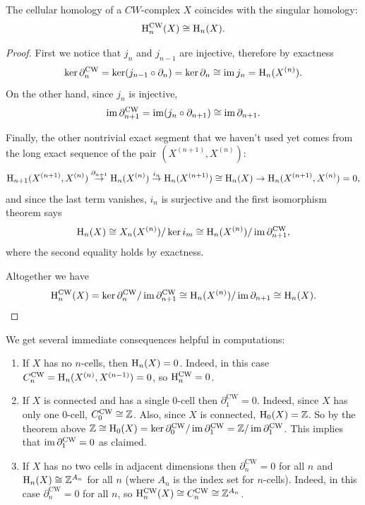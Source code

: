 \begin{thm}
    The cellular homology of a $CW$-complex $X$ coincides with the singular homology:
    \[\mathrm{H}_n^{\mathrm{CW}}(X)\cong \mathrm{H}_n(X).\]
\end{thm}
\begin{proof}
    First we notice that $j_{n}$ and $j_{n-1}$ are injective, therefore by exactness
    \[\ker\partial_n^{\mathrm{CW}}=\ker (j_{n-1}\circ\partial_n)=\ker\partial_{n}\cong \operatorname{im} j_{n}=\mathrm{H}_n(X^{(n)}).\]
    On the other hand, since $j_{n}$ is injective,
    \[\operatorname{im} \partial_{n+1}^{\mathrm{CW}}=\operatorname{im} (j_n\circ\partial_{n+1})\cong \operatorname{im} \partial_{n+1}. \]

    Finally, the other nontrivial exact segment that we haven't used yet comes from the long exact sequence of the pair $(X^{(n+1)},X^{(n)})$:
    \[\mathrm{H}_{n+1}(X^{(n+1)},X^{(n)})\overset{\partial_{n+1}}{\to} \mathrm{H}_n(X^{(n)})\overset{i_n}{\to}\mathrm{H}_n(X^{(n+1)})\cong \mathrm{H}_n(X)\to \mathrm{H}_{n}(X^{(n+1)},X^{(n)})=0,\]
    and since the last term vanishes, $i_n$ is surjective and the first isomorphism theorem says
    \[\mathrm{H}_n(X)\cong X_n(X^{(n)})\slash \ker i_m\cong \mathrm{H}_n(X^{(n)})\slash \operatorname{im} \partial_{n+1}^{\mathrm{CW}},\]
    where the second equality holds by exactness.
    
    Altogether we have
    \[\mathrm{H}_n^{\mathrm{CW}}(X)=\ker \partial_n^{\mathrm{CW}}\slash \operatorname{im} \partial_{n+1}^{\mathrm{CW}}\cong \mathrm{H}_n(X^{(n)})\slash \operatorname{im} \partial_{n+1}\cong \mathrm{H}_n(X).\]
\end{proof}

\begin{rem}
    We get several immediate consequences helpful in computations:
    \begin{enumerate}
        \item If $X$ has no $n$-cells, then $\mathrm{H}_n(X)=0$. Indeed, in this case $C^{\mathrm{CW}}_n=\mathrm{H}_n(X^{(n)},X^{(n-1)})=0$, so $\mathrm{H}_n^{\mathrm{CW}}=0$.
        \item If $X$ is connected and has a single $0$-cell then $\partial_1^{\mathrm{CW}}=0$. Indeed, since $X$ has only one $0$-cell, $C^{\mathrm{CW}}_0\cong \mathbb{Z}$. Also, since $X$ is connected, $\mathrm{H}_0(X)=\mathbb{Z}$. So by the theorem above $\mathbb{Z}\cong \mathrm{H}_0(X)=\ker \partial_0^{\mathrm{CW}}\slash \operatorname{im}\partial_1^{\mathrm{CW}}=\mathbb{Z}\slash \operatorname{im}\partial_1^{\mathrm{CW}}$. This implies that $\operatorname{im} \partial_1^{\mathrm{CW}}=0$ as claimed.
        \item If $X$ has no two cells in adjacent dimensions then $\partial_n^{\mathrm{CW}}=0$ for all $n$ and $\mathrm{H}_n(X)\cong \mathbb{Z}^{A_n}$ for all $n$ (where $A_n$ is the index set for $n$-cells). Indeed, in this case $\partial_n^{\mathrm{CW}}=0$ for all $n$, so $\mathrm{H}_n^{\mathrm{CW}}(X)\cong C_n^{\mathrm{CW}}\cong \mathbb{Z}^{A_n}$.
    \end{enumerate}
\end{rem}

